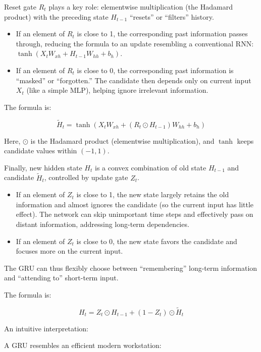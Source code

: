 Reset gate \(R_t\) plays a key role: elementwise multiplication (the Hadamard product) with the preceding state \(H_{t-1}\) ``resets'' or ``filters'' history.

\begin{itemize}
\tightlist
\item
  If an element of \(R_t\) is close to 1, the corresponding past information passes through, reducing the formula to an update resembling a conventional RNN: \(\tanh(X_t W_{xh} + H_{t-1}W_{hh} + b_h)\).
\item
  If an element of \(R_t\) is close to 0, the corresponding past information is ``masked'' or ``forgotten.'' The candidate then depends only on current input \(X_t\) (like a simple MLP), helping ignore irrelevant information.
\end{itemize}

The formula is:

\[
\tilde{H}_t = \tanh(X_t W_{xh} + (R_t \odot H_{t-1})W_{hh} + b_h)
\]

Here, \(\odot\) is the Hadamard product (elementwise multiplication), and \(\tanh\) keeps candidate values within \((-1, 1)\).

Finally, new hidden state \(H_t\) is a convex combination of old state \(H_{t-1}\) and candidate \(\tilde{H}_t\), controlled by update gate \(Z_t\).

\begin{itemize}
\tightlist
\item
  If an element of \(Z_t\) is close to 1, the new state largely retains the old information and almost ignores the candidate (so the current input has little effect). The network can skip unimportant time steps and effectively pass on distant information, addressing long-term dependencies.
\item
  If an element of \(Z_t\) is close to 0, the new state favors the candidate and focuses more on the current input.
\end{itemize}

The GRU can thus flexibly choose between ``remembering'' long-term information and ``attending to'' short-term input.

The formula is:

\[
H_t = Z_t \odot H_{t-1} + (1 - Z_t) \odot \tilde{H}_t
\]

An intuitive interpretation:

A GRU resembles an efficient modern workstation:

